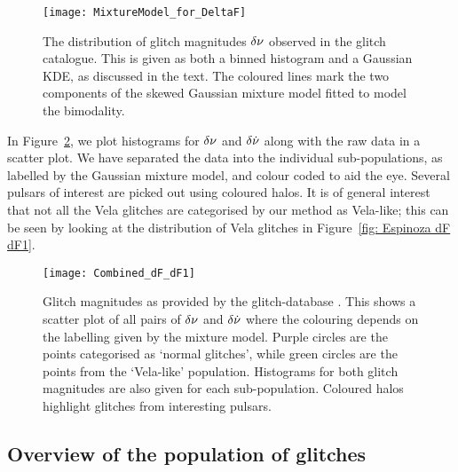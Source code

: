 \documentclass[../full_thesis/full_thesis.tex]{subfiles}
\begin{document}
\begin{figure}[htb]
\centering
\texttt{[image: MixtureModel\_for\_DeltaF]}
\caption{The distribution of glitch magnitudes $\delta\nu$ observed in the
glitch catalogue. This is given as both a binned histogram and a Gaussian
KDE, as discussed in the text. The coloured lines mark the two components of
the skewed Gaussian mixture model fitted to model the bimodality.}
\label{fig: Delta nu mixture}
\end{figure}

In Figure~\ref{fig: Espinoza dF dF1}, we plot histograms for $\delta\nu$ and
$\delta\dot{\nu}$ along with the raw data in a scatter plot. We have separated
the data into the individual sub-populations, as labelled by the Gaussian
mixture model, and colour coded to aid the eye. Several pulsars of interest are
picked out using coloured halos. It is of general interest that not all the
Vela glitches are categorised by our method as Vela-like; this can be seen by
looking at the distribution of Vela glitches in Figure~\ref{fig:
Espinoza dF dF1}.
\begin{figure*}[htb]
\centering
\texttt{[image: Combined\_dF\_dF1]}
\caption{Glitch magnitudes as provided by the glitch-database
         \citep{Espinoza2011}. This shows a scatter plot of all pairs of
         $\delta\nu$ and $\delta\dot{\nu}$ where the colouring depends on the
         labelling given by the mixture model. Purple circles are the
         points categorised as `normal glitches', while green
         circles are the points from the `Vela-like' population. Histograms for
         both glitch magnitudes are also given for each sub-population.
         Coloured halos highlight glitches from interesting pulsars.}
\label{fig: Espinoza dF dF1}
\end{figure*}


\subsection{Overview of the population of glitches}
\label{sec: overview of the population of glitches}
\end{document}
